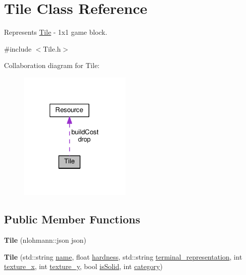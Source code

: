 \hypertarget{classTile}{\section{Tile Class Reference}
\label{classTile}
}


Represents \hyperlink{classTile}{Tile} -\/ 1x1 game block.  




{\ttfamily \#include $<$Tile.\-h$>$}



Collaboration diagram for Tile\-:
\nopagebreak
\begin{figure}[H]
\begin{center}
\leavevmode
\includegraphics[width=154pt]{classTile__coll__graph}
\end{center}
\end{figure}
\subsection*{Public Member Functions}
\begin{DoxyCompactItemize}
\item 
\hypertarget{classTile_a135790fef385f3021dccf9dde464432c}{{\bfseries Tile} (nlohmann\-::json json)}\label{classTile_a135790fef385f3021dccf9dde464432c}

\item 
\hypertarget{classTile_a48792543e2c2b7b61b5ad2970f496b0e}{{\bfseries Tile} (std\-::string \hyperlink{classTile_aa5408d0f0f4a60f25796f651db2f84ac}{name}, float \hyperlink{classTile_accd68364f51cf745c5c95717a164b2e9}{hardness}, std\-::string \hyperlink{classTile_a4792f343c63f2b7c1bf1a7321ba60206}{terminal\-\_\-representation}, int \hyperlink{classTile_ac1b8010b027d438ee826af235dc00fe1}{texture\-\_\-x}, int \hyperlink{classTile_addde9f80a365eae65b1f4bc156f18722}{texture\-\_\-y}, bool \hyperlink{classTile_a3a32e61b42ec4bc8bb1d924261c19403}{is\-Solid}, int \hyperlink{classTile_ae2d870936fb8ae7df7fdd74f4cb27035}{category})}\label{classTile_a48792543e2c2b7b61b5ad2970f496b0e}

\end{DoxyCompactItemize}
